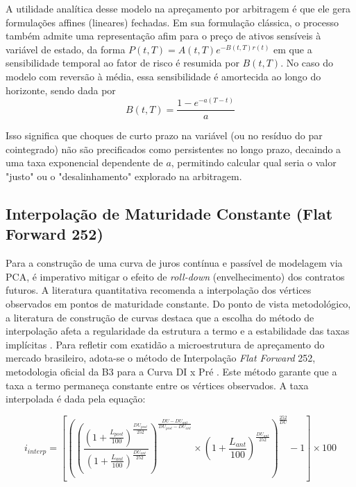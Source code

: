 \documentclass[fleqn]{rbfin}
\begin{document}
A utilidade analítica desse modelo na apreçamento por arbitragem é que ele gera formulações affines (lineares) fechadas. Em sua formulação clássica, o processo também admite uma representação afim para o preço de ativos sensíveis à variável de estado, da forma $P(t, T) = A(t, T)e^{-B(t, T)r(t)}$ em que a sensibilidade temporal ao fator de risco é resumida por \(B(t,T)\). No caso do modelo com reversão à média, essa sensibilidade é amortecida ao longo do horizonte, sendo dada por \\ 

$$B(t, T) = \frac{1 - e^{-a(T-t)}}{a}$$

Isso significa que choques de curto prazo na variável (ou no resíduo do par cointegrado) não são precificados como persistentes no longo prazo, decaindo a uma taxa exponencial dependente de $a$, permitindo calcular qual seria o valor "justo" ou o "desalinhamento" explorado na arbitragem.

\subsection{Interpolação de Maturidade Constante (Flat Forward 252)}

Para a construção de uma curva de juros contínua e passível de modelagem via PCA, é imperativo mitigar o efeito de \textit{roll-down} (envelhecimento) dos contratos futuros. A literatura quantitativa recomenda a interpolação dos vértices observados em pontos de maturidade constante. Do ponto de vista metodológico, a literatura de construção de curvas destaca que a escolha do método de interpolação afeta a regularidade da estrutura a termo e a estabilidade das taxas implícitas \cite{hagan2006interpolation}. Para refletir com exatidão a microestrutura de apreçamento do mercado brasileiro, adota-se o método de Interpolação \textit{Flat Forward} 252, metodologia oficial da B3 para a Curva DI x Pré \cite{b3manual}. Este método garante que a taxa a termo permaneça constante entre os vértices observados. A taxa interpolada é dada pela equação:

\begin{equation}
i_{interp} = \left[ \left( \left( \frac{\left( 1 + \frac{L_{post}}{100} \right)^{\frac{DU_{post}}{252}}}{\left( 1 + \frac{L_{ant}}{100} \right)^{\frac{DU_{ant}}{252}}} \right)^{\frac{DU - DU_{ant}}{DU_{post} - DU_{ant}}} \times \left( 1 + \frac{L_{ant}}{100} \right)^{\frac{DU_{ant}}{252}} \right)^{\frac{252}{DU}} - 1 \right] \times 100
\label{eq:flat_forward}
\end{equation}
\end{document}
